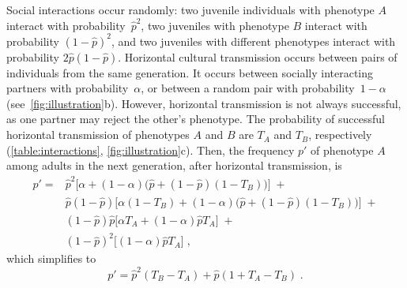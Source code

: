 \documentclass[12pt]{extarticle}
\begin{document}
Social interactions occur randomly:
two juvenile individuals with phenotype $A$ interact with probability~$\hat{p}^2$, two juveniles with phenotype $B$ interact with probability $(1-\hat{p})^2$, and two juveniles with different phenotypes interact with probability $2\hat{p}(1-\hat{p})$. 
Horizontal cultural transmission occurs between pairs of individuals from the same generation. 
It occurs between socially interacting partners with probability~$\alpha$, or between a random pair with probability~$1-\alpha$ (see~\autoref{fig:illustration}b).
However, horizontal transmission is not always successful, as one partner may reject the other's phenotype.
The probability of successful horizontal transmission of phenotypes $A$ and $B$ are $T_A$ and $T_B$, respectively (\autoref{table:interactions}, \autoref{fig:illustration}c).
Then, the frequency $p'$ of phenotype $A$ among adults in the next generation, after horizontal transmission, is 
\begin{equation}\label{eq:nextgen_adults}
\begin{aligned}
p' = 
& \hat{p}^2 \big[\alpha + (1-\alpha)\big(\hat{p} + (1-\hat{p})(1-T_B)\big)\big] \;+ \\
& \hat{p}(1-\hat{p}) \big[\alpha(1-T_B) + (1-\alpha)\big(\hat{p} + (1-\hat{p})(1-T_B)\big)\big] \;+ \\
& (1-\hat{p})\hat{p} \big[\alpha T_A + (1-\alpha) \hat{p} T_A \big] \;+ \\
& (1-\hat{p})^2 \big[(1-\alpha) \hat{p} T_A \big] \;,
\end{aligned}
\end{equation}
which simplifies to
\begin{equation}\label{eq:nextgen_adults_slimpify}
p' = \hat{p}^2(T_B-T_A) + \hat{p}(1+T_A-T_B) \;.
\end{equation}
\end{document}
